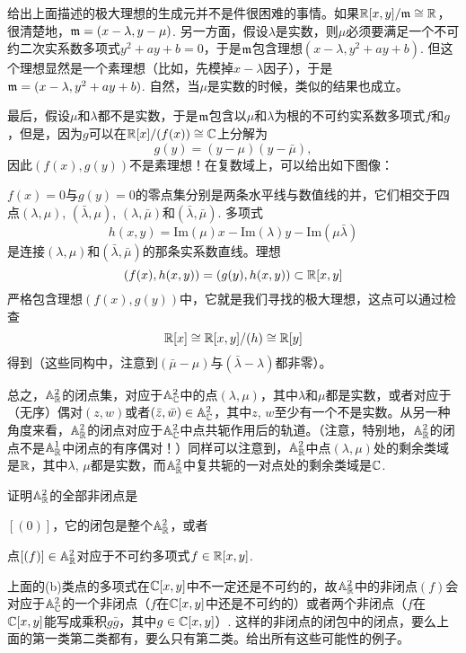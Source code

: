 给出上面描述的极大理想的生成元并不是件很困难的事情。如果$\mathbb{R}[x,y]/\mathfrak{m}\cong \mathbb{R} $，很清楚地，$\mathfrak{m}=(x-\lambda,y-\mu)$. 另一方面，假设$\lambda$是实数，则$\mu$必须要满足一个不可约二次实系数多项式$y^2+ay+b=0$，于是$\mathfrak{m}$包含理想$(x-\lambda,y^2+ay+b)$. 但这个理想显然是一个素理想（比如，先模掉$x-\lambda$因子），于是$\mathfrak{m}=(x-\lambda,y^2+ay+b)$. 自然，当$\mu$是实数的时候，类似的结果也成立。

最后，假设$\mu$和$\lambda$都不是实数，于是$\mathfrak{m}$包含以$\mu$和$\lambda$为根的不可约实系数多项式$f$和$g$，但是，因为$g$可以在$\mathbb{R}[x]/(f(x))\cong \mathbb{C}$上分解为
\[
	g(y)=(y-\mu)(y-\bar\mu),
\]
因此$(f(x),g(y))$不是素理想！在复数域上，可以给出如下图像：


$f(x)=0$与$g(y)=0$的零点集分别是两条水平线与数值线的并，它们相交于四点$(\lambda,\mu)$, $(\bar\lambda,\mu)$, $(\lambda,\bar\mu)$和$(\bar\lambda,\bar\mu)$. 多项式
\[
	h(x,y)=\mathrm{Im}(\mu) x - \mathrm{Im}(\lambda)  y -\mathrm{Im}(\mu\bar\lambda)
\]
是连接$(\lambda,\mu)$和$(\bar\lambda,\bar\mu)$的那条实系数直线。理想
\[
	(f(x),h(x,y))=(g(y),h(x,y))\subset \mathbb{R}[x,y]
\]
严格包含理想$(f(x),g(y))$中，它就是我们寻找的极大理想，这点可以通过检查
\[
	\mathbb{R}[x]\cong \mathbb{R}[x,y]/(h)\cong \mathbb{R}[y]
\]
得到（这些同构中，注意到$(\bar\mu-\mu)$与$(\bar\lambda-\lambda)$都非零）。

总之，$\mathbb{A}_{\mathbb{R}}^2$的闭点集，对应于$\mathbb{A}_{\mathbb{C}}^2$中的点$(\lambda,\mu)$，其中$\lambda$和$\mu$都是实数，或者对应于（无序）偶对$(z,w)$或者$(\bar z,\bar w)\in \mathbb{A}_{\mathbb{C}}^2$，其中$z$, $w$至少有一个不是实数。从另一种角度来看，$\mathbb{A}_{\mathbb{R}}^2$的闭点对应于$\mathbb{A}_{\mathbb{C}}^2$中点共轭作用后的轨道。（注意，特别地，$\mathbb{A}_{\mathbb{R}}^2$的闭点不是$\mathbb{A}_{\mathbb{R}}^1$中闭点的有序偶对！）同样可以注意到，$\mathbb{A}_{\mathbb{R}}^2$中点$(\lambda,\mu)$处的剩余类域是$\mathbb{R}$，其中$\lambda$, $\mu$都是实数，而$\mathbb{A}_{\mathbb{R}}^2$中复共轭的一对点处的剩余类域是$\mathbb{C}$.

\begin{exe}
	证明$\mathbb{A}^2_{\mathbb{R}}$的全部非闭点是
	\begin{compactenum}[(a)]
		\item $[(0)]$，它的闭包是整个$\mathbb{A}^2_{\mathbb{R}}$，或者
		\item 点$[(f)]\in \mathbb{A}^2_{\mathbb{R}}$对应于不可约多项式$f\in \mathbb{R}[x,y]$.
	\end{compactenum}

	上面的(b)类点的多项式在$\mathbb{C}[x,y]$中不一定还是不可约的，故$\mathbb{A}^2_{\mathbb{R}}$中的非闭点$(f)$会对应于$\mathbb{A}^2_{\mathbb{C}}$的一个非闭点（$f$在$\mathbb{C}[x,y]$中还是不可约的）或者两个非闭点（$f$在$\mathbb{C}[x,y]$能写成乘积$g\bar g$，其中$g\in\mathbb{C}[x,y]$）. 这样的非闭点的闭包中的闭点，要么上面的第一类第二类都有，要么只有第二类。给出所有这些可能性的例子。
\end{exe}

